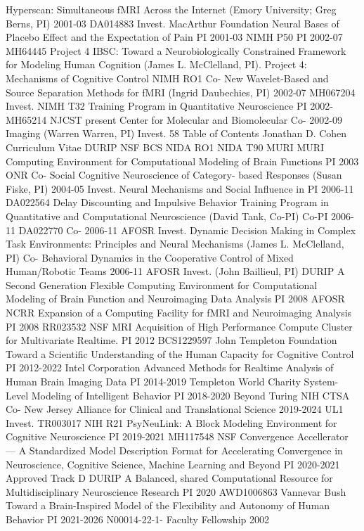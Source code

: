 \documentclass[10 pt]{article}
\begin{document}
Hyperscan: Simultaneous fMRI Across the Internet (Emory University; Greg Berns, PI)
2001-03 DA014883
Invest.
MacArthur
Foundation
Neural Bases of Placebo Effect and the
Expectation of Pain
PI 2001-03
NIMH P50 PI
2002-07 MH64445
Project 4
IBSC: Toward a Neurobiologically Constrained Framework for Modeling Human Cognition (James L. McClelland, PI). Project 4: Mechanisms of Cognitive Control
NIMH RO1 Co-
New Wavelet-Based and Source Separation Methods for fMRI (Ingrid Daubechies, PI)
2002-07 MH067204
Invest.
NIMH T32 Training Program in Quantitative Neuroscience PI 2002-
MH65214
NJCST present
Center for Molecular and Biomolecular
Co-
2002-09
Imaging (Warren Warren, PI)
Invest.
58 Table of Contents
Jonathan D. Cohen Curriculum Vitae
DURIP NSF BCS NIDA RO1 NIDA T90 MURI MURI Computing Environment for Computational Modeling of Brain Functions
PI 2003 ONR
Co-
Social Cognitive Neuroscience of Category- based Responses (Susan Fiske, PI)
2004-05
Invest.
Neural Mechanisms and Social Influence in
PI 2006-11 DA022564
Delay Discounting and Impulsive Behavior
Training Program in Quantitative and Computational Neuroscience (David Tank, Co-PI)
Co-PI 2006-11 DA022770
Co-
2006-11 AFOSR
Invest.
Dynamic Decision Making in Complex Task Environments: Principles and Neural Mechanisms (James L. McClelland, PI)
Co-
Behavioral Dynamics in the Cooperative Control of Mixed Human/Robotic Teams
2006-11 AFOSR
Invest.
(John Baillieul, PI)
DURIP A Second Generation Flexible Computing Environment for Computational Modeling of Brain Function and Neuroimaging Data Analysis
PI 2008 AFOSR
NCRR Expansion of a Computing Facility for fMRI and Neuroimaging Analysis
PI 2008 RR023532
NSF MRI Acquisition of High Performance Compute Cluster for Multivariate Realtime.
PI 2012 BCS1229597
John Templeton Foundation Toward a Scientific Understanding of the Human Capacity for Cognitive Control
PI 2012-2022
Intel Corporation Advanced Methods for Realtime Analysis of Human Brain Imaging Data
PI 2014-2019
Templeton World Charity System-Level Modeling of Intelligent Behavior PI 2018-2020 Beyond Turing
NIH CTSA Co-
New Jersey Alliance for Clinical and Translational Science
2019-2024 UL1
Invest.
TR003017
NIH R21 PsyNeuLink: A Block Modeling Environment for Cognitive Neuroscience
PI 2019-2021 MH117548
NSF
Convergence Accellerator —
A Standardized Model Description Format for Accelerating Convergence in Neuroscience, Cognitive Science, Machine Learning and Beyond
PI 2020-2021 Approved
Track D
DURIP A Balanced, shared Computational Resource for Multidisciplinary Neuroscience Research
PI 2020 AWD1006863
Vannevar Bush
Toward a Brain-Inspired Model of the Flexibility and Autonomy of Human Behavior
PI 2021-2026 N00014-22-1-
Faculty Fellowship
2002
\end{document}
